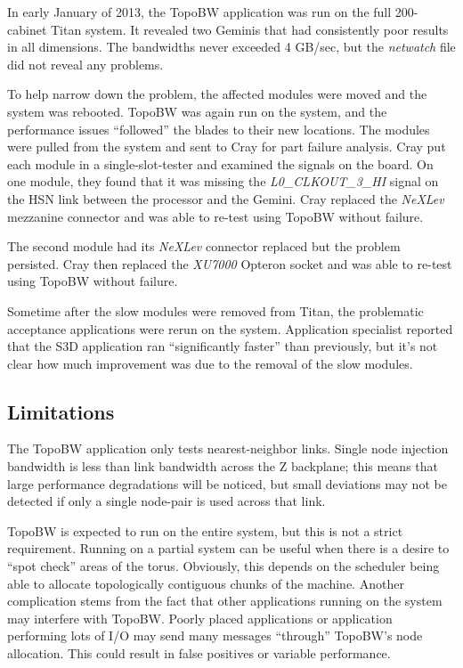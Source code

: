 \documentclass[10pt, conference, compsocconf]{IEEEtran}
\begin{document}
In early January of 2013, the TopoBW application was run on the full
200-cabinet Titan system.  It revealed two Geminis that had consistently poor
results in all dimensions.  The bandwidths never exceeded 4 GB/sec, but the
\emph{netwatch} file did not reveal any problems.

To help narrow down the problem, the affected modules were moved and the system
was rebooted.  TopoBW was again run on the system, and the performance issues
``followed'' the blades to their new locations.  The modules were pulled from
the system and sent to Cray for part failure analysis.  Cray put each module in
a single-slot-tester and examined the signals on the board.  On one module,
they found that it was missing the \emph{L0\_CLKOUT\_3\_HI} signal on the HSN
link between the processor and the Gemini.  Cray replaced the \emph{NeXLev}
mezzanine connector and was able to re-test using TopoBW without failure.

The second module had its \emph{NeXLev} connector replaced but the problem
persisted.  Cray then replaced the \emph{XU7000} Opteron socket and was able to
re-test using TopoBW without failure.

Sometime after the slow modules were removed from Titan, the problematic
acceptance applications were rerun on the system.  Application specialist
reported that the S3D application ran ``significantly faster'' than previously,
but it's not clear how much improvement was due to the removal of the slow
modules.

\subsection{Limitations}

The TopoBW application only tests nearest-neighbor links. Single node injection
bandwidth is less than link bandwidth across the Z backplane; this means that
large performance degradations will be noticed, but small deviations may not be
detected if only a single node-pair is used across that link.

TopoBW is expected to run on the entire system, but this is not a strict
requirement.  Running on a partial system can be useful when there is a desire
to ``spot check'' areas of the torus.  Obviously, this depends on the scheduler
being able to allocate topologically contiguous chunks of the machine.  Another
complication stems from the fact that other applications running on the system
may interfere with TopoBW.  Poorly placed applications or application
performing lots of I/O may send many messages ``through'' TopoBW's node
allocation.  This could result in false positives or variable performance.
\end{document}
